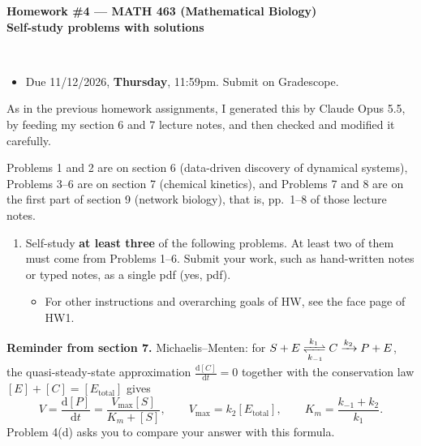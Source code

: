 \documentclass[a4paper,12pt]{article}
\begin{document}

\begin{center}
\begin{large}
\textbf{Homework \#4 ---  MATH 463 (Mathematical Biology)\\
Self-study problems with solutions}
\end{large}\\
\end{center}

\begin{screen}
\begin{itemize}
\item Due 11/12/2026, \textbf{Thursday}, 11:59pm. Submit on Gradescope.
\end{itemize}
\end{screen}

As in the previous homework assignments, I generated this by Claude Opus 5.5, by feeding my section 6 and 7 lecture notes, and then checked and modified it carefully.

Problems 1 and 2 are on section 6 (data-driven discovery of dynamical systems), Problems 3--6 are on section 7 (chemical kinetics), and Problems 7 and 8 are on the first part of section 9 (network biology), that is, pp.~1--8 of those lecture notes.

\begin{enumerate}

\item Self-study \textbf{at least three} of the following problems. At least two of them must come from Problems 1--6. Submit your work, such as hand-written notes or typed notes, as a single pdf (yes, pdf).
\begin{itemize}
\item For other instructions and overarching goals of HW, see the face page of HW1.
\end{itemize}

\end{enumerate}

\textbf{Reminder from section 7.} Michaelis--Menten: for $S + E \xrightleftharpoons[k_{-1}]{k_1} C \xrightarrow{k_2} P + E$, the quasi-steady-state approximation $\frac{\text{d}[C]}{\text{d}t}=0$ together with the conservation law $[E]+[C]=[E_{\text{total}}]$ gives
\[ V = \frac{\text{d}[P]}{\text{d}t} = \frac{V_{\max}[S]}{K_m+[S]},
\qquad V_{\max} = k_2 [E_{\text{total}}],
\qquad K_m = \frac{k_{-1}+k_2}{k_1} . \]
Problem 4(d) asks you to compare your answer with this formula.
\end{document}
